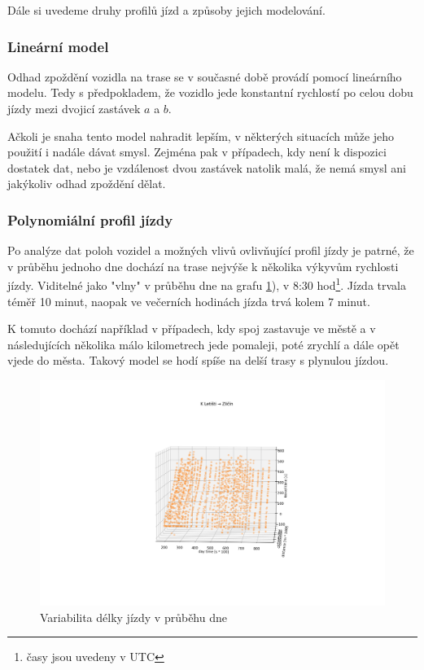 \bigbreak


Dále si uvedeme druhy profilů jízd a způsoby jejich modelování.


\subsubsection{Lineární model}




Odhad zpoždění vozidla na trase se v současné době provádí pomocí lineárního modelu. Tedy s předpokladem, že vozidlo jede konstantní rychlostí po celou dobu jízdy mezi dvojicí zastávek $a$ a $b$.


\bigbreak


Ačkoli je snaha tento model nahradit lepším, v některých situacích může jeho použití i nadále dávat smysl. Zejména pak v případech, kdy není k dispozici dostatek dat, nebo je vzdálenost dvou zastávek natolik malá, že nemá smysl ani jakýkoliv odhad zpoždění dělat.


\subsubsection{Polynomiální profil jízdy}


Po analýze dat poloh vozidel a možných vlivů ovlivňující profil jízdy je patrné, že v průběhu jednoho dne dochází na trase nejvýše k několika výkyvům rychlosti jízdy. Viditelné jako "vlny" v průběhu dne na grafu \ref{fig:dojezd_ve_fazich_dne}), v 8:30 hod\footnote{časy jsou uvedeny v UTC}. Jízda trvala téměř 10 minut, naopak ve večerních hodinách jízda trvá kolem 7 minut.


\bigbreak


K tomuto dochází například v případech, kdy spoj zastavuje ve městě a v následujících několika málo kilometrech jede pomaleji, poté zrychlí a dále opět vjede do města. Takový model se hodí spíše na delší trasy s plynulou jízdou.


\begin{figure}
\centering
  \includegraphics[width=\linewidth]{../img/dojezd_ve_fazich_dne.png}
  \caption{Variabilita délky jízdy v průběhu dne}
  \label{fig:dojezd_ve_fazich_dne}
\end{figure}


